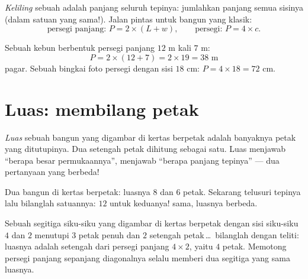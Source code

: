 \begin{definition}[Keliling]\label{def:g4:measure:perimeter}
\emph{Keliling} sebuah  adalah panjang
seluruh tepinya: jumlahkan panjang semua sisinya (dalam satuan yang
sama!). Jalan pintas untuk bangun yang klasik:
\[
\text{persegi panjang: } P = 2 \times (L + w),
\qquad
\text{persegi: } P = 4 \times c .
\]
\end{definition}

\begin{example}\label{ex:g4:measure:perimeter}
Sebuah kebun berbentuk persegi panjang $12$ m kali $7$ m:
\[
P = 2 \times (12 + 7) = 2 \times 19 = 38 \text{ m}
\]
pagar. Sebuah bingkai foto persegi dengan sisi $18$ cm:
$P = 4 \times 18 = 72$ cm.
\end{example}

\section{Luas: membilang petak}

\begin{definition}\label{def:g4:measure:area}
\emph{Luas} sebuah bangun yang digambar di kertas
berpetak adalah banyaknya petak yang ditutupinya. Dua setengah petak
dihitung sebagai satu. Luas menjawab ``berapa besar permukaannya'',
 menjawab ``berapa panjang tepinya'' --- dua pertanyaan yang
berbeda!
\end{definition}

\begin{omfigure}

{\small Dua bangun di kertas berpetak: luasnya $8$ dan $6$ petak.
Sekarang telusuri tepinya lalu bilanglah satuannya: $12$ untuk
keduanya!  sama, luasnya berbeda.}
\end{omfigure}

\begin{example}\label{ex:g4:measure:half}
Sebuah segitiga siku-siku yang digambar di kertas berpetak dengan
sisi siku-siku $4$ dan $2$ menutupi $3$ petak penuh dan $2$ setengah
petak\,\dots\ bilanglah dengan teliti: luasnya adalah setengah dari
persegi panjang $4 \times 2$, yaitu $4$ petak. Memotong persegi
panjang sepanjang diagonalnya selalu memberi dua segitiga yang sama
luasnya.
\end{example}

